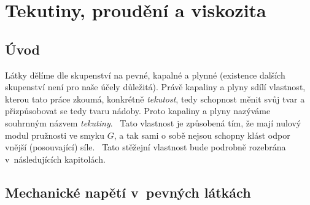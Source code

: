 \documentclass[12pt]{article}
\begin{document}
\newpage%
\section{Tekutiny, proudění a viskozita}%

\subsection{Úvod}%

Látky dělíme dle skupenství na pevné, kapalné a plynné (existence dalších skupenství není pro naše účely důležitá). Právě kapaliny a plyny sdílí vlastnost, kterou tato práce zkoumá, konkrétně \emph{tekutost}, tedy schopnost měnit svůj tvar a přizpůsobovat se tedy tvaru nádoby. Proto kapaliny a plyny nazýváme souhrnným názvem \emph{tekutiny}.~\cite{wiki:Tekutina} Tato vlastnost je způsobená tím, že mají nulový modul pružnosti ve smyku $G$, a tak sami o sobě nejsou schopny klást odpor vnější (posouvající) síle.~\cite{wiki:Fluid} Tato stěžejní vlastnost bude podrobně rozebrána v~následujících kapitolách.

\subsection{Mechanické napětí v~pevných látkách}%
\end{document}
